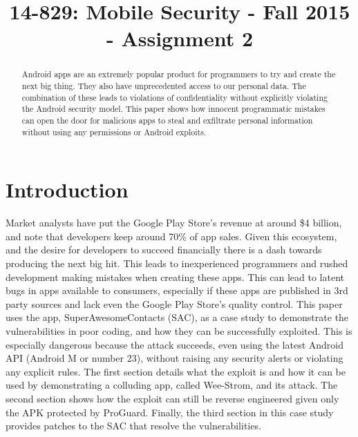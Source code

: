 \documentclass[conference,compsoc]{IEEEtran}
\begin{document}
\title{14-829: Mobile Security - Fall 2015 - Assignment 2}
\author{
}
\maketitle














\begin{abstract}
Android apps are an extremely popular product for programmers to try and create the next big thing. They also have unprecedented access to our personal data. The combination of these leads to violations of confidentiality without explicitly violating the Android security model. This paper shows how innocent programmatic mistakes can open the door for malicious apps to steal and exfiltrate personal information without using any permissions or Android exploits.
\end{abstract}


\section{Introduction}
Market analysts have put the Google Play Store's revenue at around \$4 billion, and note that developers keep around 70\% of app sales\cite{Wallenstein}. Given this ecosystem, and the desire for developers to succeed financially there is a dash towards producing the next big hit. This leads to inexperienced programmers and rushed development making mistakes when creating these apps. This can lead to latent bugs in apps available to consumers, especially if these apps are published in 3rd party sources and lack even the Google Play Store's quality control\cite{Google:LaunchChecklist}.
\newline
\indent This paper uses the app, SuperAwesomeContacts (SAC), as a case study to demonstrate the vulnerabilities in poor coding, and how they can be successfully exploited. This is especially dangerous because the attack succeeds, even using the latest Android API (Android M or number 23), without raising any security alerts or violating any explicit rules. The first section details what the exploit is and how it can be used by demonstrating a colluding app, called Wee-Strom, and its attack. The second section shows how the exploit can still be reverse engineered given only the APK protected by ProGuard\cite{Google:ProGuard}. Finally, the third section in this case study provides patches to the SAC that resolve the vulnerabilities.
\end{document}
